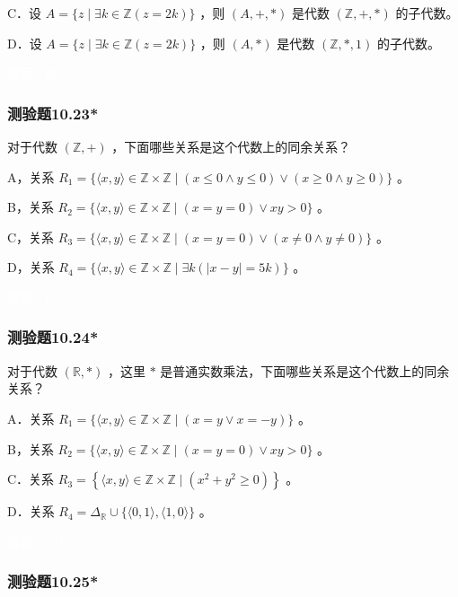 \documentclass[UTF8, heading=true]{ctexart}
\begin{document}
C．设 $A=\{z \mid \exists k \in \mathbb{Z}(z=2 k)\}$ ，则 $(A,+, *)$ 是代数 $(\mathbb{Z},+, *)$ 的子代数。

D．设 $A=\{z \mid \exists k \in \mathbb{Z}(z=2 k)\}$ ，则 $(A, *)$ 是代数 $(\mathbb{Z}, *, 1)$ 的子代数。

\textcolor{white}{答案：BC}

\subsubsection{测验题10.23*}

对于代数 $(\mathbb{Z},+)$ ，下面哪些关系是这个代数上的同余关系？

A，关系 $R_1=\{\langle x, y\rangle \in \mathbb{Z} \times \mathbb{Z} \mid(x \leq 0 \wedge y \leq 0) \vee(x \geq 0 \wedge y \geq 0)\}$ 。

B，关系 $R_2=\{\langle x, y\rangle \in \mathbb{Z} \times \mathbb{Z} \mid(x=y=0) \vee x y>0\}$ 。

C，关系 $R_3=\{\langle x, y\rangle \in \mathbb{Z} \times \mathbb{Z} \mid(x=y=0) \vee(x \neq 0 \wedge y \neq 0)\}$ 。

D，关系 $R_4=\{\langle x, y\rangle \in \mathbb{Z} \times \mathbb{Z} \mid \exists k(|x-y|=5 k)\}$ 。


\textcolor{white}{答案：D}

\subsubsection{测验题10.24*}

对于代数 $(\mathbb{R}, *)$ ，这里 $*$ 是普通实数乘法，下面哪些关系是这个代数上的同余关系？

A．关系 $R_1=\{\langle x, y\rangle \in \mathbb{Z} \times \mathbb{Z} \mid(x=y \vee x=-y)\}$ 。

B，关系 $R_2=\{\langle x, y\rangle \in \mathbb{Z} \times \mathbb{Z} \mid(x=y=0) \vee x y>0\}$ 。

C．关系 $R_3=\left\{\langle x, y\rangle \in \mathbb{Z} \times \mathbb{Z} \mid\left(x^2+y^2 \geq 0\right)\right\}$ 。

D．关系 $R_4=\Delta_{\mathbb{R}} \cup\{\langle 0,1\rangle,\langle 1,0\rangle\}$ 。


\textcolor{white}{答案：ABC}

\subsubsection{测验题10.25*}
\end{document}
